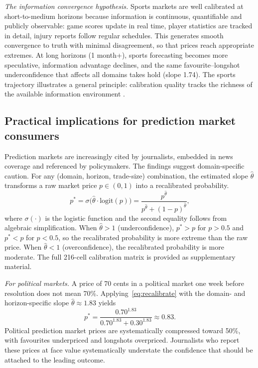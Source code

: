 \documentclass[numsec,webpdf,modern,medium]{oup-authoring-template}
\theoremstyle{thmstyleone}%
\theoremstyle{thmstyletwo}%
\theoremstyle{thmstylethree}%
\begin{document}
\emph{The information convergence hypothesis.} Sports markets are well calibrated at short-to-medium horizons because information is continuous, quantifiable and publicly observable: game scores update in real time, player statistics are tracked in detail, injury reports follow regular schedules. This generates smooth convergence to truth with minimal disagreement, so that prices reach appropriate extremes. At long horizons (1 month+), sports forecasting becomes more speculative, information advantage declines, and the same favourite--longshot underconfidence that affects all domains takes hold (slope 1.74). The sports trajectory illustrates a general principle: calibration quality tracks the richness of the available information environment \citep[cf.][]{sunstein2006infotopia}.
\subsection{Practical implications for prediction market consumers}\label{sec:practical}

Prediction markets are increasingly cited by journalists, embedded in news coverage and referenced by policymakers. The findings suggest domain-specific caution. For any (domain, horizon, trade-size) combination, the estimated slope $\hat{\theta}$ transforms a raw market price $p \in (0,1)$ into a recalibrated probability.
\begin{equation}\label{eq:recalibrate}
p^* = \sigma\!\bigl(\hat{\theta} \cdot \mathrm{logit}(p)\bigr) = \frac{p^{\hat{\theta}}}{p^{\hat{\theta}} + (1-p)^{\hat{\theta}}},
\end{equation}
where $\sigma(\cdot)$ is the logistic function and the second equality follows from algebraic simplification. When $\hat{\theta} > 1$ (underconfidence), $p^* > p$ for $p > 0.5$ and $p^* < p$ for $p < 0.5$, so the recalibrated probability is more extreme than the raw price. When $\hat{\theta} < 1$ (overconfidence), the recalibrated probability is more moderate. The full 216-cell calibration matrix is provided as supplementary material.

\emph{For political markets.} A price of 70 cents in a political market one week before resolution does not mean 70\%. Applying~\eqref{eq:recalibrate} with the domain- and horizon-specific slope $\hat{\theta} \approx 1.83$ yields
\begin{equation}\label{eq:example}
p^* = \frac{0.70^{1.83}}{0.70^{1.83} + 0.30^{1.83}} \approx 0.83.
\end{equation}
Political prediction market prices are systematically compressed toward 50\%, with favourites underpriced and longshots overpriced. Journalists who report these prices at face value systematically understate the confidence that should be attached to the leading outcome.
\end{document}
